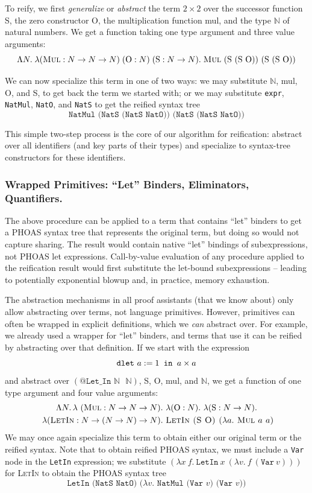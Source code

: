 To reify, we first \emph{generalize} or \emph{abstract} the term $2\times 2$ over the successor function S, the zero constructor O, the multiplication function mul, and the type $\mathbb N$ of natural numbers.
We get a function taking one type argument and three value arguments:
$$\Lambda N. \; \lambda (\textsc{Mul} : N \to N \to N) \; (\text{O} : N) \; (\text{S} : N \to N). \; \text{\textsc{Mul} (S (S O)) (S (S O))}$$

We can now specialize this term in one of two ways: we may substitute $\mathbb N$, mul, O, and S, to get back the term we started with; or we may substitute \texttt{expr}, \texttt{NatMul}, \texttt{NatO}, and \texttt{NatS} to get the reified syntax tree
\[
\texttt{NatMul (NatS (NatS NatO)) (NatS (NatS NatO))}
\]

This simple two-step process is the core of our algorithm for reification:
abstract over all identifiers (and key parts of their types) and specialize to syntax-tree constructors for these identifiers.

\subsubsection{Wrapped Primitives: ``Let'' Binders, Eliminators, Quantifiers.}\label{sec:walkthrough-wrapped}

The above procedure can be applied to a term that contains ``let'' binders to get a
PHOAS syntax tree that represents the original term, but doing so would not capture
sharing. The result would contain native ``let'' bindings of subexpressions, not
PHOAS let expressions. Call-by-value evaluation of any procedure applied to the
reification result would first substitute the let-bound subexpressions --
leading to potentially exponential blowup and, in practice, memory exhaustion.

The abstraction mechanisms in all proof assistants (that we know about) only allow abstracting over terms, not language primitives.
However, primitives can often be wrapped in explicit definitions, which we \emph{can} abstract over.
For example, we already used a wrapper for ``let'' binders, and terms that use it can be reified by abstracting over that definition.
If we start with the expression
\[
\text{\texttt{dlet} }a := 1\texttt{ in }a \times a
\]
and abstract over $(\texttt{@Let\_In $\mathbb N$ $\mathbb N$})$, S, O, mul, and $\mathbb{N}$,
we get a function of one type argument and four value arguments:
\begin{multline*}
\Lambda N.\,\lambda
\ (\textsc{Mul} : N \to N \to N).
\ \lambda (\text{O} : N).
\ \lambda (\text{S} : N \to N). \\
\ \lambda (\textsc{LetIn} : N \to (N\to N)\to N).
\ \textsc{LetIn (S O) ($\lambda a.$ Mul $a$ $a$)}
\end{multline*}
We may once again specialize this term to obtain either our original term or the reified syntax.
Note that to obtain reified PHOAS syntax, we must include a \texttt{Var} node in the \texttt{LetIn} expression; we substitute $(\lambda x\ f.\ \texttt{LetIn}\ x\ (\lambda v.\ f\ (\texttt{Var}\ v)))$ for \textsc{LetIn} to obtain the PHOAS syntax tree
\[
  \texttt{LetIn (NatS NatO) ($\lambda v.$ NatMul (Var $v$) (Var $v$))}
\]

